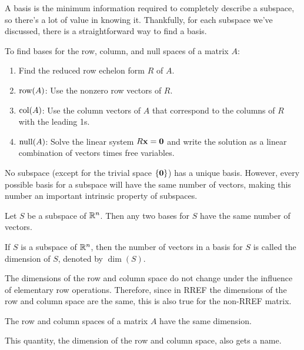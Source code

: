 \documentclass[../m73main.tex]{subfiles}
\begin{document}
A basis is the minimum information required to completely describe a subspace, so there's a lot of value in knowing it.
Thankfully, for each subspace we've discussed, there is a straightforward way to find a basis.

\begin{definition}
	To find bases for the row, column, and null spaces of a matrix $A$:
	\begin{enumerate}
		\item Find the reduced row echelon form $R$ of $A$.
		\item $\textrm{row}(A)$: Use the nonzero row vectors of $R$.
		\item $\textrm{col}(A)$: Use the column vectors of $A$ that correspond to the columns of $R$ with the leading 1s.
		\item $\textrm{null}(A)$: Solve the linear system $R\mathbf{x} = \mathbf{0}$ and write the solution as a linear combination of vectors times free variables.
	\end{enumerate}
\end{definition}

No subspace (except for the trivial space $\{ \mathbf{0} \}$) has a unique basis.
However, every possible basis for a subspace will have the same number of vectors, making this number an important intrinsic property of subspaces.

\begin{theorem}
	Let $S$ be a subspace of $\mathbb{R}^n$.
	Then any two bases for $S$ have the same number of vectors.
\end{theorem}

\begin{definition}[Dimension]
	If $S$ is a subspace of $\mathbb{R}^n$, then the number of vectors in a basis for $S$ is called the dimension of $S$, denoted by $\dim(S)$.
\end{definition}

The dimensions of the row and column space do not change under the influence of elementary row operations.
Therefore, since in RREF the dimensions of the row and column space are the same, this is also true for the non-RREF matrix.

\begin{theorem}
	The row and column spaces of a matrix $A$ have the same dimension.
\end{theorem}

This quantity, the dimension of the row and column space, also gets a name.
\end{document}
